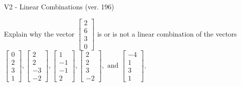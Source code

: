 \begin{exercise}
  \begin{exerciseTitle}V2 - Linear Combinations (ver. 196)\end{exerciseTitle}
  \begin{exerciseStatement}
    Explain why the vector \(\left[\begin{array}{c}
2 \\
6 \\
3 \\
0
\end{array}\right]\)  is or is not a linear 
	combination of the vectors \(\left[\begin{array}{c}
0 \\
2 \\
3 \\
1
\end{array}\right] , \left[\begin{array}{c}
2 \\
2 \\
-3 \\
-2
\end{array}\right] , \left[\begin{array}{c}
1 \\
-1 \\
-1 \\
2
\end{array}\right] , \left[\begin{array}{c}
2 \\
2 \\
3 \\
-2
\end{array}\right] , \text{ and } \left[\begin{array}{c}
-4 \\
1 \\
3 \\
1
\end{array}\right]\).
	



\end{exerciseStatement}
\end{exercise}

